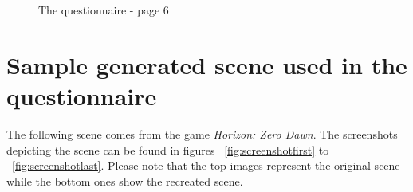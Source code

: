 \begin{figure}[h]
	\caption{The questionnaire - page 6}\label{fig:lastquestionnaire}
\end{figure}



\section{Sample generated scene used in the questionnaire \label{sec:samplescene}}
The following scene comes from the game \textit{Horizon: Zero Dawn}. The screenshots depicting the scene can be found in figures ~\ref{fig:screenshotfirst} to ~\ref{fig:screenshotlast}. Please note that the top images represent the original scene while the bottom ones show the recreated scene. 


